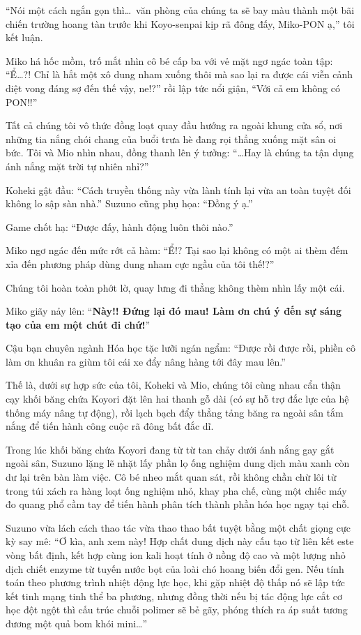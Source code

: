 \documentclass[../main.tex]{subfiles}
\begin{document}
``Nói một cách ngắn gọn thì\dots\ văn phòng của chúng ta sẽ bay màu thành một bãi chiến trường hoang tàn trước khi Koyo-senpai kịp rã đông đấy, Miko-PON ạ,'' tôi kết luận.

Miko há hốc mồm, trố mắt nhìn cô bé cấp ba với vẻ mặt ngơ ngác toàn tập: ``Ể\dots?! Chỉ là hắt một xô dung nham xuống thôi mà sao lại ra được cái viễn cảnh diệt vong đáng sợ đến thế vậy, ne!?'' rồi lập tức nổi giận, ``Với cả em không có PON!!''

Tất cả chúng tôi vô thức đồng loạt quay đầu hướng ra ngoài khung cửa sổ, nơi những tia nắng chói chang của buổi trưa hè đang rọi thẳng xuống mặt sân oi bức. Tôi và Mio nhìn nhau, đồng thanh lên ý tưởng: ``\dots Hay là chúng ta tận dụng ánh nắng mặt trời tự nhiên nhỉ?''

Koheki gật đầu: ``Cách truyền thống này vừa lành tính lại vừa an toàn tuyệt đối không lo sập sàn nhà.'' Suzuno cũng phụ họa: ``Đồng ý ạ.''

Game chốt hạ: ``Được đấy, hành động luôn thôi nào.''

Miko ngơ ngác đến mức rớt cả hàm: ``Ể!? Tại sao lại không có một ai thèm đếm xỉa đến phương pháp dùng dung nham cực ngầu của tôi thế!?''

Chúng tôi hoàn toàn phớt lờ, quay lưng đi thẳng không thèm nhìn lấy một cái.

Miko giãy nảy lên: ``\textbf{Này!! Đứng lại đó mau! Làm ơn chú ý đến sự sáng tạo của em một chút đi chứ!}''

Cậu bạn chuyên ngành Hóa học tặc lưỡi ngán ngẩm: ``Được rồi được rồi, phiền cô làm ơn khuân ra giùm tôi cái xe đẩy nâng hàng tới đây mau lên.''

Thế là, dưới sự hợp sức của tôi, Koheki và Mio, chúng tôi cùng nhau cẩn thận cạy khối băng chứa Koyori đặt lên hai thanh gỗ dài (có sự hỗ trợ đắc lực của hệ thống máy nâng tự động), rồi lạch bạch đẩy thẳng tảng băng ra ngoài sân tắm nắng để tiến hành công cuộc rã đông bất đắc dĩ.


\ct

Trong lúc khối băng chứa Koyori đang từ từ tan chảy dưới ánh nắng gay gắt ngoài sân, Suzuno lặng lẽ nhặt lấy phần lọ ống nghiệm dung dịch màu xanh còn dư lại trên bàn làm việc. Cô bé nheo mắt quan sát, rồi không chần chừ lôi từ trong túi xách ra hàng loạt ống nghiệm nhỏ, khay pha chế, cùng một chiếc máy đo quang phổ cầm tay để tiến hành phân tích thành phần hóa học ngay tại chỗ.

Suzuno vừa lách cách thao tác vừa thao thao bất tuyệt bằng một chất giọng cực kỳ say mê: ``Ơ kìa, anh xem này! Hợp chất dung dịch này cấu tạo từ liên kết este vòng bất định, kết hợp cùng ion kali hoạt tính ở nồng độ cao và một lượng nhỏ dịch chiết enzyme từ tuyến nước bọt của loài chó hoang biến đổi gen. Nếu tính toán theo phương trình nhiệt động lực học, khi gặp nhiệt độ thấp nó sẽ lập tức kết tinh mạng tinh thể ba phương, nhưng đồng thời nếu bị tác động lực cắt cơ học đột ngột thì cấu trúc chuỗi polimer sẽ bẻ gãy, phóng thích ra áp suất tương đương một quả bom khói mini\dots''
\end{document}
